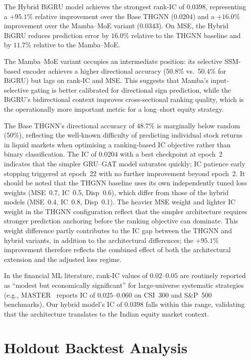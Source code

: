 \documentclass[a4paper,11pt]{report}
\begin{document}
The Hybrid BiGRU model achieves the strongest rank-IC of $0.0398$, representing a $+95.1\%$ relative improvement over the Base THGNN ($0.0204$) and a $+16.0\%$ improvement over the Mamba--MoE variant ($0.0343$). On MSE, the Hybrid BiGRU reduces prediction error by $16.0\%$ relative to the THGNN baseline and by $11.7\%$ relative to the Mamba--MoE.

The Mamba--MoE variant occupies an intermediate position: its selective SSM-based encoder achieves a higher directional accuracy (50.8\% vs.\ 50.4\% for BiGRU) but lags on rank-IC and MSE. This suggests that Mamba's input-selective gating is better calibrated for directional sign prediction, while the BiGRU's bidirectional context improves cross-sectional ranking quality, which is the operationally more important metric for a long--short equity strategy.

The Base THGNN's directional accuracy of $48.7\%$ is marginally below random (50\%), reflecting the well-known difficulty of predicting individual stock returns in liquid markets when optimising a ranking-based IC objective rather than binary classification. The IC of $0.0204$ with a best checkpoint at epoch~2 indicates that the simpler GRU--GAT model saturates quickly; IC patience early stopping triggered at epoch~22 with no further improvement beyond epoch~2. It should be noted that the THGNN baseline uses its own independently tuned loss weights (MSE~0.7, IC~0.5, Disp~0.6), which differ from those of the hybrid models (MSE~0.4, IC~0.8, Disp~0.1). The heavier MSE weight and lighter IC weight in the THGNN configuration reflect that the simpler architecture requires stronger prediction anchoring before the ranking objective can dominate. This weight difference partly contributes to the IC gap between the THGNN and hybrid variants, in addition to the architectural differences; the $+95.1\%$ improvement therefore reflects the combined effect of both the architectural extension and the adjusted loss regime.

In the financial ML literature, rank-IC values of $0.02$--$0.05$ are routinely reported as ``modest but economically significant'' for large-universe systematic strategies (e.g., MASTER~\cite{li2024master} reports IC of $0.025$--$0.060$ on CSI~300 and S\&P~500 benchmarks). Our hybrid model's IC of $0.0398$ falls within this range, validating that the architecture translates to the Indian equity market context.

\section{Holdout Backtest Analysis}
\label{sec:backtest}
\end{document}
